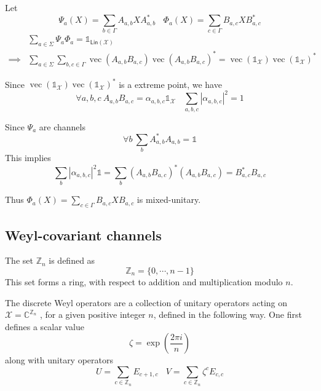 \documentclass[aps,pra,onecolumn,notitlepage,superscriptaddress]{revtex4-1}
\newcommand{\Z}{\mathbb{Z}}
\newcommand{\C}{\mathbb{C}}
\newcommand{\spc}[1]{\mathcal{#1}}
\newcommand{\Lin}{\mathsf{Lin}}
\newcommand{\op}[1]{\operatorname{#1}}
\newcommand\I{\mathds{1}}
\begin{document}
{\begin{enumerate}
            Let\begin{equation}
                \Psi_a(X) = \sum_{b \in \Gamma} A_{a,b} X A_{a,b}^* \ \ \ \ \Phi_a(X) = \sum_{c \in \Gamma} B_{a,c} X B_{a,c}^*
            \end{equation}
            \begin{align*}
                &\sum_{a \in \Sigma} \Psi_a\Phi_a = \I_{\Lin(\spc X)} \\
                \implies& \sum_{a \in \Sigma} \sum_{b,c \in \Gamma} \op{vec}(A_{a,b}B_{a,c}) \op{vec}(A_{a,b}B_{a,c})^* = \op{vec}(\I_{\spc X}) \op{vec}(\I_{\spc X})^*
            \end{align*}

            Since $\op{vec}(\I_{\spc X}) \op{vec}(\I_{\spc X})^*$ is a extreme point, we have
            \begin{equation}
                \forall a,b,c \ A_{a,b}B_{a,c} = \alpha_{a,b,c} \I_{\spc X} \ \ \ \ \sum_{a,b,c} |\alpha_{a,b,c}|^2 = 1
            \end{equation}

            Since $\Psi_a$ are channels
            \begin{equation*}
                \forall b \ \sum_b A_{a,b}^*A_{a,b} = \I
            \end{equation*}
            This implies
            \begin{equation}
                \sum_b |\alpha_{a,b,c}|^2 \I = \sum_b (A_{a,b}B_{a,c})^*(A_{a,b}B_{a,c}) = B_{a,c}^*B_{a,c}
            \end{equation}

            Thus $\Phi_a(X) = \sum_{c \in \Gamma} B_{a,c} X B_{a,c}$ is mixed-unitary.
        \end{enumerate}
    }

    \subsection{Weyl-covariant channels}
    The set $\Z_n$ is defined as
    \begin{equation}
        \Z_n = \{ 0, \cdots, n-1 \}
    \end{equation}
    This set forms a ring, with respect to addition and multiplication modulo $n$.

    The discrete Weyl operators are a collection of unitary operators acting on $\spc X = \C^{\Z_n}$ , for a given positive integer $n$, defined in the following way. One first defines a scalar value
    \begin{equation}
        \zeta = \exp \left( \frac{2\pi i}{n} \right)
    \end{equation}
    along with unitary operators
    \begin{equation}
        U = \sum_{c \in \Z_n} E_{c+1,c} \ \ \ \ V = \sum_{c \in \Z_n} \zeta^c E_{c,c}
    \end{equation}
\end{document}
